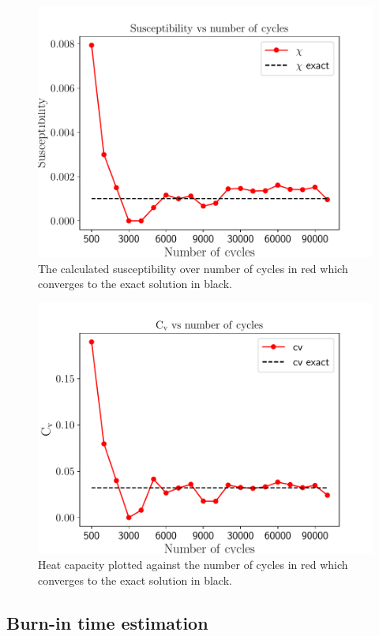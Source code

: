 \documentclass[english,notitlepage,reprint,nofootinbib]{revtex4-2}  %
\begin{document}
	\begin{figure}[h!]
		\centering
		\includegraphics[scale=0.55]{figures/chi_problem4.pdf}
		\caption{The calculated susceptibility over number of cycles in red which converges to the exact solution in black.}
		\label{fig:chi4}
	\end{figure}

	\begin{figure}[h!]
		\centering
		\includegraphics[scale=0.55]{figures/CV_problem4.pdf}
		\caption{Heat capacity plotted against the number of cycles in red which converges to the exact solution in black.}
		\label{fig:cv4}
	\end{figure}

	\subsection{Burn-in time estimation}\label{subsec: burn in estimation}
\end{document}

